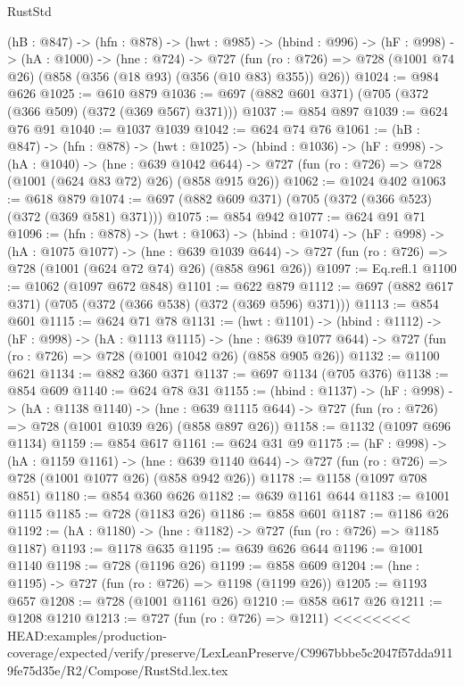 \begin{lexlean}{RustStd}
\begin{coremodule}
{\begin{coremodule}
  (hB : @847) ->
  (hfn : @878) ->
  (hwt : @985) ->
  (hbind : @996) ->
  (hF : @998) ->
  (hA : @1000) ->
  (hne : @724) ->
  @727 (fun (ro : @726) => @728 (@1001 @74 @26) (@858 (@356 (@18 @93) (@356 (@10 @83) @355)) @26))
@1024 := @984 @626
@1025 := @610 @879
@1036 := @697 (@882 @601 @371) (@705 (@372 (@366 @509) (@372 (@369 @567) @371)))
@1037 := @854 @897
@1039 := @624 @76 @91
@1040 := @1037 @1039
@1042 := @624 @74 @76
@1061 := (hB : @847) ->
  (hfn : @878) ->
  (hwt : @1025) ->
  (hbind : @1036) ->
  (hF : @998) ->
  (hA : @1040) ->
  (hne : @639 @1042 @644) ->
  @727 (fun (ro : @726) => @728 (@1001 (@624 @83 @72) @26) (@858 @915 @26))
@1062 := @1024 @402
@1063 := @618 @879
@1074 := @697 (@882 @609 @371) (@705 (@372 (@366 @523) (@372 (@369 @581) @371)))
@1075 := @854 @942
@1077 := @624 @91 @71
@1096 := (hfn : @878) ->
  (hwt : @1063) ->
  (hbind : @1074) ->
  (hF : @998) ->
  (hA : @1075 @1077) ->
  (hne : @639 @1039 @644) ->
  @727 (fun (ro : @726) => @728 (@1001 (@624 @72 @74) @26) (@858 @961 @26))
@1097 := Eq.refl.{1}
@1100 := @1062 (@1097 @672 @848)
@1101 := @622 @879
@1112 := @697 (@882 @617 @371) (@705 (@372 (@366 @538) (@372 (@369 @596) @371)))
@1113 := @854 @601
@1115 := @624 @71 @78
@1131 := (hwt : @1101) ->
  (hbind : @1112) ->
  (hF : @998) ->
  (hA : @1113 @1115) ->
  (hne : @639 @1077 @644) -> @727 (fun (ro : @726) => @728 (@1001 @1042 @26) (@858 @905 @26))
@1132 := @1100 @621
@1134 := @882 @360 @371
@1137 := @697 @1134 (@705 @376)
@1138 := @854 @609
@1140 := @624 @78 @31
@1155 := (hbind : @1137) ->
  (hF : @998) ->
  (hA : @1138 @1140) ->
  (hne : @639 @1115 @644) -> @727 (fun (ro : @726) => @728 (@1001 @1039 @26) (@858 @897 @26))
@1158 := @1132 (@1097 @696 @1134)
@1159 := @854 @617
@1161 := @624 @31 @9
@1175 := (hF : @998) ->
  (hA : @1159 @1161) ->
  (hne : @639 @1140 @644) -> @727 (fun (ro : @726) => @728 (@1001 @1077 @26) (@858 @942 @26))
@1178 := @1158 (@1097 @708 @851)
@1180 := @854 @360 @626
@1182 := @639 @1161 @644
@1183 := @1001 @1115
@1185 := @728 (@1183 @26)
@1186 := @858 @601
@1187 := @1186 @26
@1192 := (hA : @1180) -> (hne : @1182) -> @727 (fun (ro : @726) => @1185 @1187)
@1193 := @1178 @635
@1195 := @639 @626 @644
@1196 := @1001 @1140
@1198 := @728 (@1196 @26)
@1199 := @858 @609
@1204 := (hne : @1195) -> @727 (fun (ro : @726) => @1198 (@1199 @26))
@1205 := @1193 @657
@1208 := @728 (@1001 @1161 @26)
@1210 := @858 @617 @26
@1211 := @1208 @1210
@1213 := @727 (fun (ro : @726) => @1211)
<<<<<<<< HEAD:examples/production-coverage/expected/verify/preserve/LexLeanPreserve/C9967bbbe5c2047f57dda9119fe75d35e/R2/Compose/RustStd.lex.tex

\end{coremodule}}
\end{coremodule}
\end{lexlean}
